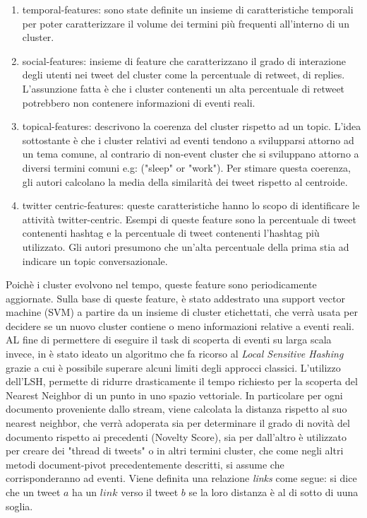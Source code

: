 \documentclass[a4paper,12pt]{report}
\begin{document}
\begin{enumerate}
\item temporal-features: sono state definite un insieme di caratteristiche temporali per poter caratterizzare il volume dei termini più frequenti all'interno di un cluster.
\item social-features: insieme di feature che caratterizzano il grado di interazione degli utenti nei tweet del cluster come la percentuale di retweet, di replies. L'assunzione fatta è che i cluster contenenti un alta percentuale di retweet potrebbero non contenere informazioni di eventi reali.
\item topical-features: descrivono la coerenza del cluster rispetto ad un topic. L'idea sottostante è che i cluster relativi ad eventi tendono a svilupparsi attorno ad un tema comune, al contrario di non-event cluster che si sviluppano attorno a diversi termini comuni e.g: ("sleep" or "work"). Per stimare questa coerenza, gli autori calcolano la media della similarità dei tweet rispetto al centroide.
\item twitter centric-features: queste caratteristiche hanno lo scopo di identificare le attività twitter-centric. Esempi di queste feature sono la percentuale di tweet contenenti hashtag e la percentuale di tweet contenenti l'hashtag più utilizzato. Gli autori presumono che un'alta percentuale della prima stia ad indicare un topic conversazionale.
\end{enumerate}
Poichè i cluster evolvono nel tempo, queste feature sono periodicamente aggiornate.
Sulla base di queste feature, è stato addestrato una support vector machine (SVM) a partire da un insieme di cluster etichettati, che verrà usata per decidere se un nuovo cluster contiene o meno informazioni relative a eventi reali. AL fine di permettere di eseguire il task di scoperta di eventi su larga scala invece, in \cite{Petrovic:2010:SFS:1857999.1858020} è stato ideato un algoritmo che fa ricorso al \emph{Local Sensitive Hashing}\cite{Lsh}  grazie a cui è possibile superare alcuni limiti degli approcci classici.
L'utilizzo dell'LSH, permette di ridurre drasticamente il tempo richiesto per la scoperta del Nearest Neighbor di un punto in uno spazio vettoriale.
In particolare per ogni documento proveniente dallo stream, viene calcolata la distanza rispetto al suo nearest neighbor, che verrà adoperata sia per determinare il grado di novità del documento rispetto ai precedenti (Novelty Score), sia per dall'altro è utilizzato per creare dei "thread di tweets" o in altri termini cluster, che come negli altri metodi document-pivot precedentemente descritti, si assume che  corrisponderanno ad eventi. Viene definita una relazione \emph{links} come segue: si dice che un tweet   $a$ ha un $link$ verso il tweet $b$  se la loro distanza è al di sotto di uuna soglia.  
\end{document}
